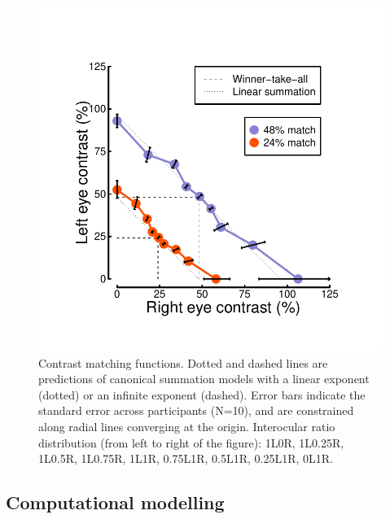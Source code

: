 \documentclass[
]{article}
\begin{document}
\begin{figure}

{\centering \includegraphics{Figures/matchingdata} 

}

\caption{Contrast matching functions. Dotted and dashed lines are predictions of canonical summation models with a linear exponent (dotted) or an infinite exponent (dashed). Error bars indicate the standard error across participants (N=10), and are constrained along radial lines converging at the origin. Interocular ratio distribution (from left to right of the figure): 1L0R, 1L0.25R, 1L0.5R, 1L0.75R, 1L1R, 0.75L1R, 0.5L1R, 0.25L1R, 0L1R.}\label{fig:matchingdata}
\end{figure}

\hypertarget{computational-modelling}{%
\subsection{Computational modelling}\label{computational-modelling}}
\end{document}
